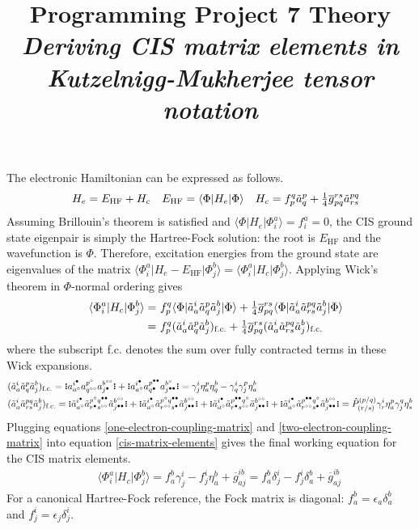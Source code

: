 \documentclass[11pt,fleqn]{article}
\title{Programming Project 7 Theory\\
\textit{Deriving CIS matrix elements in Kutzelnigg-Mukherjee tensor notation}}
\date{}
\author{}
\newcommand{\g}{\gamma}      %
\renewcommand{\d}{\delta}    %
\newcommand{\ev}{\epsilon}   %
\newcommand{\h}{\eta}        %
\newcommand{\F}{\Phi}        %
\newcommand{\tl}{\ensuremath{\tilde}}
\newcommand{\ol}[1]{\ensuremath{\overline{#1}}}
\newcommand{\op}[1]{\ensuremath{\hat{#1}}}
\newcommand{\ip}[1]{\ensuremath{\langle#1\rangle}}
\newcommand{\GNO}[1]{\setstackgap{S}{0.7pt}\ensuremath{\Shortstack{\textbf{.} \textbf{.} \textbf{.}}#1\Shortstack{\textbf{.} \textbf{.} \textbf{.}}}}
\theoremstyle{mystyle}
\newcommand{\hole}{\circ}
\newcommand{\ptcl}{\bullet}
\begin{document}
\maketitle
\vspace{-1cm}

\noindent
The electronic Hamiltonian can be expressed as follows.
\begin{align}
&&
  H_e
=
  E_{\text{HF}}
+
  H_c
&&
  E_{\text{HF}}
=
  \ip{\F|H_e|\F}
&&
  H_c
=
  f_p^q
  \tl{a}_q^p
+
  \tfrac{1}{4}
  \ol{g}_{pq}^{rs}
  \tl{a}_{rs}^{pq}
\end{align}
Assuming Brillouin's theorem is satisfied and $\ip{\F|H_e|\F_i^a}=f_i^a=0$, the CIS ground state eigenpair is simply the Hartree-Fock solution: the root is $E_{\text{HF}}$ and the wavefunction is $\F$.
Therefore, excitation energies from the ground state are eigenvalues of the matrix $\ip{\F_i^a|H_e-E_{\text{HF}}|\F_j^b}=\ip{\F_i^a|H_c|\F_j^b}$.
Applying Wick's theorem in $\F$-normal ordering gives
\begin{align}
&&\nonumber
  \ip{\F_i^a|H_c|\F_j^b}
=&\
  f_p^q
  \ip{\F|\tl{a}_a^i\tl{a}_q^p\tl{a}_j^b|\F}
+
  \tfrac{1}{4}
  \ol{g}_{pq}^{rs}
  \ip{\F|\tl{a}_a^i\tl{a}_{rs}^{pq}\tl{a}_j^b|\F}
\\&&=&\
\label{cis-matrix-elements}
  f_p^q
  (\tl{a}_a^i\tl{a}_q^p\tl{a}_j^b)_{\text{f.c.}}
+
  \tfrac{1}{4}
  \ol{g}_{pq}^{rs}
  (\tl{a}_a^i\tl{a}_{rs}^{pq}\tl{a}_j^b)_{\text{f.c.}}
\end{align}
where the subscript f.c. denotes the sum over fully contracted terms in these Wick expansions.
\begin{align}
\label{one-electron-coupling-matrix}
&
  (\tl{a}_a^i\tl{a}_q^p\tl{a}_j^b)_{\text{f.c.}}
=
  \GNO{a_{a^\hole}^{i^\ptcl}a_{q^{\hole\hole}}^{p^\hole}a_{j^\ptcl}^{b^{\hole\hole}}}
+
  \GNO{a_{a^\hole}^{i^{\ptcl}}a_{q^{\ptcl}}^{p^{\ptcl\ptcl}}a_{j^{\ptcl\ptcl}}^{b^{\hole}}}
=
  \g^i_j\h_a^p\h_q^b
-
  \g_q^i\g_j^p\h_a^b
\\
\label{two-electron-coupling-matrix}
&
  (\tl{a}_a^i\tl{a}_{rs}^{pq}\tl{a}_j^b)_{\text{f.c.}}
=
  \GNO{
    \tl{a}_{a^\hole}^{i^\ptcl}
    \tl{a}_{r^{\ptcl}s^{\hole\hole}}^{p^{\hole}q^{\ptcl\ptcl}}
    \tl{a}_{j^{\ptcl\ptcl}}^{b^{\hole\hole}}
  }
+
  \GNO{
    \tl{a}_{a^\hole}^{i^\ptcl}
    \tl{a}_{r^{\hole\hole}s^{\ptcl}}^{p^{\hole}q^{\ptcl\ptcl}}
    \tl{a}_{j^{\ptcl\ptcl}}^{b^{\hole\hole}}
  }
+
  \GNO{
    \tl{a}_{a^\hole}^{i^\ptcl}
    \tl{a}_{r^{\ptcl}s^{\hole\hole}}^{p^{\ptcl\ptcl}q^{\hole}}
    \tl{a}_{j^{\ptcl\ptcl}}^{b^{\hole\hole}}
  }
+
  \GNO{
    \tl{a}_{a^\hole}^{i^\ptcl}
    \tl{a}_{r^{\hole\hole}s^{\ptcl}}^{p^{\ptcl\ptcl}q^{\hole}}
    \tl{a}_{j^{\ptcl\ptcl}}^{b^{\hole\hole}}
  }
=
  \op{P}^{(p/q)}_{(r/s)}
  \g^i_r\h^p_a\g^q_j\h^b_s
\end{align}
Plugging equations \ref{one-electron-coupling-matrix} and \ref{two-electron-coupling-matrix} into equation \ref{cis-matrix-elements} gives the final working equation for the CIS matrix elements.
\begin{align}
\label{cis-equations}
&&
  \ip{\F_i^a|H_c|\F_j^b}
=
  f_a^b\g_j^i
-
  f_j^i\h_a^b
+
  \ol{g}_{aj}^{ib}
=
  f_a^b\d_j^i
-
  f_j^i\d_a^b
+
  \ol{g}_{aj}^{ib}
\end{align}
For a canonical Hartree-Fock reference, the Fock matrix is diagonal: $f_a^b=\ev_a\d_a^b$ and $f_j^i=\ev_j\d_j^i$.
\end{document}
